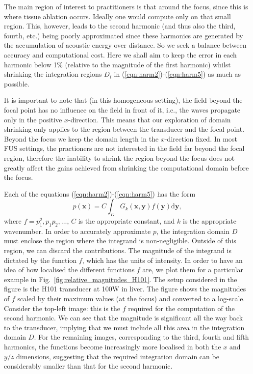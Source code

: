 \documentclass[11pt]{article}
\numberwithin{equation}{section}
\newcommand{\sd}{\mbox{d}}
\newcommand{\bx}{\mathbf{x}}
\newcommand{\by}{\mathbf{y}}
\newcommand{\red}[1]{{\color{black} #1}}
\begin{document}
The main region of interest to practitioners is that around the focus, since 
this is where tissue ablation occurs. Ideally one would compute only 
on that small region. This, however, leads to the second harmonic (and 
thus also the third, fourth, etc.) being poorly approximated since these harmonics
are generated by the accumulation of acoustic energy over distance. So we seek a 
balance between accuracy and computational cost. Here we shall aim to 
keep the error in each harmonic below 1\% (relative to the magnitude of 
the first harmonic) whilst shrinking the integration regions $D_i$ in 
(\ref{eqn:harm2})-(\ref{eqn:harm5}) as much as possible. 

It is important to note that (in this homogeneous setting), the field beyond the 
focal point has no influence on the field in front of it, i.e., the waves propagate
only in the positive $x$-direction. This means that our exploration of domain 
shrinking only applies to the region between the transducer and the focal point.
Beyond the focus we keep the domain length in the $x$-direction fixed. In most
\red{FUS} settings, the practioners are not interested in the field far beyond the 
focal region, therefore the inability to shrink the region beyond the focus does 
not greatly affect the gains achieved from shrinking the computational domain before the focus.

Each of the equations (\ref{eqn:harm2})-(\ref{eqn:harm5}) has the form
\begin{equation}
    p(\bx) = C\int_D G_k(\bx,\by) f(\by) \sd\by,
    \label{eqn:RHS}
\end{equation}
where $f = p_1^2, p_1p_2,\ldots$, $C$ is the appropriate constant, and $k$ is the 
appropriate wavenumber. In order to accurately approximate $p$, the integration 
domain $D$ must enclose the region where the integrand
is non-negligible. Outside of this region, we can discard the contributions. 
The magnitude of the integrand is dictated by the function $f$, which has the 
units of intensity. In order to have
an idea of how localised the different functions $f$ are, we plot them
for a particular example in Fig.~\ref{fig:relative_magnitudes_H101}. The setup considered in the figure 
is the H101 transducer at 100W in liver. The figure shows the magnitudes of $f$
scaled by their maximum values (at the focus) and converted to a log-scale. 
Consider the top-left image: this is the $f$ required for the computation of the 
second harmonic. We can see that the magnitude is significant all the way back 
to the transducer, implying that we must include all this area in the integration 
domain $D$. For the remaining images, corresponding to the third, fourth and 
fifth harmonics, the functions become increasingly more localised in both the 
$x$ and $y/z$ dimensions, suggesting that the required integration domain can
be considerably smaller than that for the second harmonic.
\end{document}
